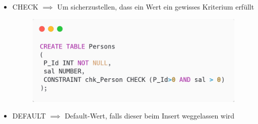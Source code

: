 \begin{itemize}
\begin{itemize}
    \end{itemize}
    \item CHECK $\implies$ Um sicherzustellen, dass ein Wert ein gewisses Kriterium erfüllt
    \begin{figure}[H]
        \centering
        \includegraphics[scale=.3]{res/themenkorb_3/check.png}
    \end{figure}
    \item DEFAULT $\implies$ Default-Wert, falls dieser beim Insert weggelassen wird
\end{itemize}

